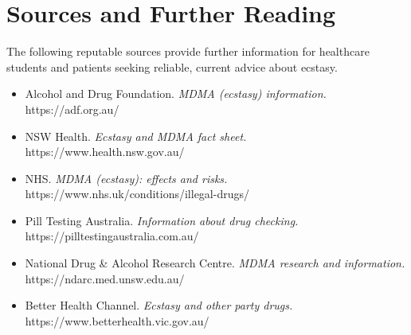 \section*{Sources and Further Reading}
The following reputable sources provide further information for healthcare students and patients seeking reliable, current advice about ecstasy.
\begin{itemize}
    \item Alcohol and Drug Foundation. \textit{MDMA (ecstasy) information.} https://adf.org.au/
    \item NSW Health. \textit{Ecstasy and MDMA fact sheet.} https://www.health.nsw.gov.au/
    \item NHS. \textit{MDMA (ecstasy): effects and risks.} https://www.nhs.uk/conditions/illegal-drugs/
    \item Pill Testing Australia. \textit{Information about drug checking.} https://pilltestingaustralia.com.au/
    \item National Drug \& Alcohol Research Centre. \textit{MDMA research and information.} https://ndarc.med.unsw.edu.au/
    \item Better Health Channel. \textit{Ecstasy and other party drugs.} https://www.betterhealth.vic.gov.au/
\end{itemize}
